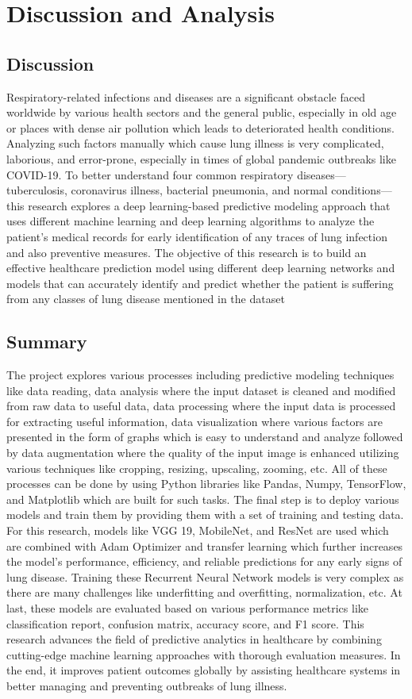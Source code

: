 \chapter{Discussion and Analysis}

\section{Discussion}
Respiratory-related infections and diseases are a significant obstacle faced worldwide by various health sectors and the general public, especially in old age or places with dense air pollution which leads to deteriorated health conditions. Analyzing such factors manually which cause lung illness is very complicated, laborious, and error-prone, especially in times of global pandemic outbreaks like COVID-19. To better understand four common respiratory diseases—tuberculosis, coronavirus illness, bacterial pneumonia, and normal conditions—this research explores a deep learning-based predictive modeling approach that uses different machine learning and deep learning algorithms to analyze the patient’s medical records for early identification of any traces of lung infection and also preventive measures. The objective of this research is to build an effective healthcare prediction model using different deep learning networks and models that can accurately identify and predict whether the patient is suffering from any classes of lung disease mentioned in the dataset

\section{Summary}
The project explores various processes including predictive modeling techniques like data reading, data analysis where the input dataset is cleaned and modified from raw data to useful data, data processing where the input data is processed for extracting useful information, data visualization where various factors are presented in the form of graphs which is easy to understand and analyze followed by data augmentation where the quality of the input image is enhanced utilizing various techniques like cropping, resizing, upscaling, zooming, etc. All of these processes can be done by using Python libraries like Pandas, Numpy, TensorFlow, and Matplotlib which are built for such tasks. The final step is to deploy various models and train them by providing them with a set of training and testing data. For this research, models like VGG 19, MobileNet, and ResNet are used which are combined with Adam Optimizer and transfer learning which further increases the model’s performance, efficiency, and reliable predictions for any early signs of lung disease. Training these Recurrent Neural Network models is very complex as there are many challenges like underfitting and overfitting, normalization, etc. At last, these models are evaluated based on various performance metrics like classification report, confusion matrix, accuracy score, and F1 score. This research advances the field of predictive analytics in healthcare by combining cutting-edge machine learning approaches with thorough evaluation measures. In the end, it improves patient outcomes globally by assisting healthcare systems in better managing and preventing outbreaks of lung illness.

